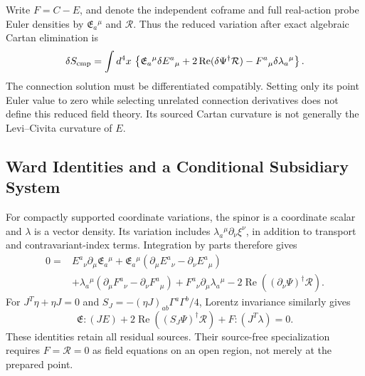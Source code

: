 Write $F=C-E$, and denote the independent coframe and full real-action
probe Euler densities by $\mathfrak E_a{}^\mu$ and $\mathcal R$. Thus the
reduced variation after exact algebraic Cartan elimination is
\[
 \delta S_{\rm cmp}=\int d^4x\,
 \left\{\mathfrak E_a{}^\mu\delta E^a{}_{\mu}
       +2\operatorname{Re}(\delta\Psi^\dagger\mathcal R)
       -F^a{}_{\mu}\delta\lambda_a{}^\mu\right\}.
\]
The connection solution must be differentiated compatibly. Setting only
its point Euler value to zero while selecting unrelated connection
derivatives does not define this reduced field theory. Its sourced
Cartan curvature is not generally the Levi--Civita curvature of $E$.

\subsection{Ward Identities and a Conditional Subsidiary System}
\label{v490:cartan-ward}

For compactly supported coordinate variations, the spinor is a coordinate
scalar and $\lambda$ is a vector density. Its variation includes
$\lambda_a{}^\mu\partial_\nu\xi^\nu$, in addition to transport and
contravariant-index terms. Integration by parts therefore gives
\begin{align}
0={}&E^a{}_{\nu}\partial_\mu\mathfrak E_a{}^\mu
 +\mathfrak E_a{}^\mu(\partial_\mu E^a{}_{\nu}
                             -\partial_\nu E^a{}_{\mu})\nonumber\\
 &+\lambda_a{}^\mu(\partial_\mu F^a{}_{\nu}
                             -\partial_\nu F^a{}_{\mu})
 +F^a{}_{\nu}\partial_\mu\lambda_a{}^\mu
 -2\operatorname{Re}((\partial_\nu\Psi)^\dagger\mathcal R).
 \label{v490:coordinate-identity}
\end{align}
For $J^T\eta+\eta J=0$ and
$S_J=-(\eta J)_{ab}\Gamma^a\Gamma^b/4$, Lorentz invariance similarly gives
\[
 \mathfrak E:(JE)+2\operatorname{Re}((S_J\Psi)^\dagger\mathcal R)
                          +F:(J^T\lambda)=0.
\]
These identities retain all residual sources. Their source-free
specialization requires $F=\mathcal R=0$ as field equations on an open
region, not merely at the prepared point.

